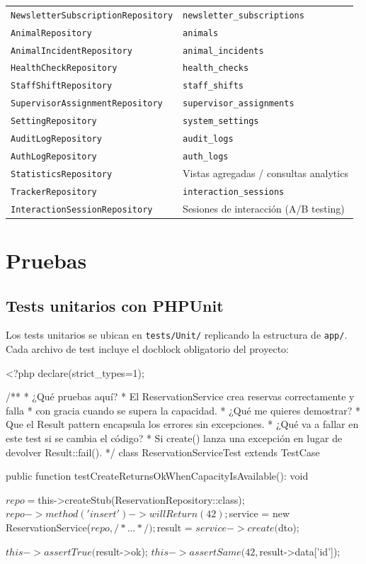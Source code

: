 \documentclass[12pt,a4paper,twoside,openright]{report}
\begin{document}
\begin{longtable}{@{}lp{7cm}@{}}
  \texttt{NewsletterSubscriptionRepository}& \texttt{newsletter\_subscriptions}\\
  \texttt{AnimalRepository}                & \texttt{animals}\\
  \texttt{AnimalIncidentRepository}        & \texttt{animal\_incidents}\\
  \texttt{HealthCheckRepository}           & \texttt{health\_checks}\\
  \texttt{StaffShiftRepository}            & \texttt{staff\_shifts}\\
  \texttt{SupervisorAssignmentRepository}  & \texttt{supervisor\_assignments}\\
  \texttt{SettingRepository}               & \texttt{system\_settings}\\
  \texttt{AuditLogRepository}              & \texttt{audit\_logs}\\
  \texttt{AuthLogRepository}               & \texttt{auth\_logs}\\
  \texttt{StatisticsRepository}            & Vistas agregadas / consultas analytics\\
  \texttt{TrackerRepository}               & \texttt{interaction\_sessions}\\
  \texttt{InteractionSessionRepository}    & Sesiones de interacción (A/B testing)\\
\end{longtable}

\section{Pruebas}
\label{sec:pruebas}

\subsection{Tests unitarios con PHPUnit}

Los tests unitarios se ubican en \texttt{tests/Unit/} replicando la estructura de
\texttt{app/}. Cada archivo de test incluye el docblock obligatorio del proyecto:

\begin{phpcode}[caption={Estructura de test unitario}]
<?php declare(strict_types=1);

/**
 * ¿Qué pruebas aquí?
 *    El ReservationService crea reservas correctamente y falla
 *    con gracia cuando se supera la capacidad.
 * ¿Qué me quieres demostrar?
 *    Que el Result pattern encapsula los errores sin excepciones.
 * ¿Qué va a fallar en este test si se cambia el código?
 *    Si create() lanza una excepción en lugar de devolver Result::fail().
 */
class ReservationServiceTest extends TestCase
{
    public function testCreateReturnsOkWhenCapacityIsAvailable(): void
    {
        $repo = $this->createStub(ReservationRepository::class);
        $repo->method('insert')->willReturn(42);

        $service = new ReservationService($repo, /* ... */);
        $result  = $service->create($dto);

        $this->assertTrue($result->ok);
        $this->assertSame(42, $result->data['id']);
    }
}
\end{phpcode}
\end{document}
